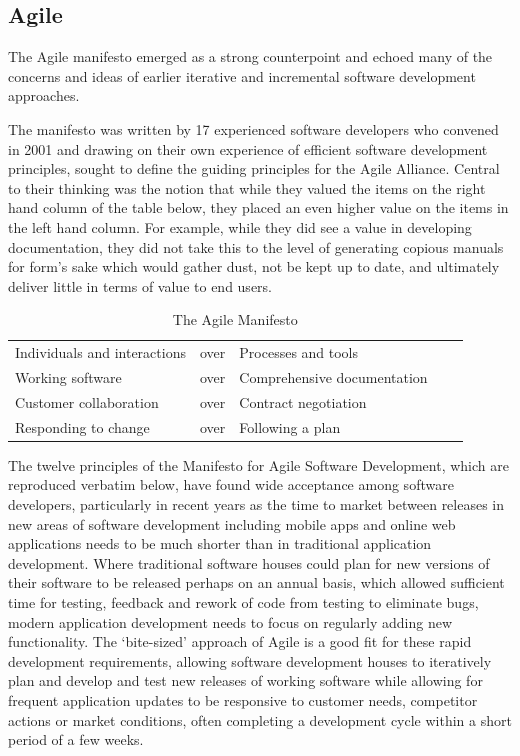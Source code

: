\documentclass[a4paper,12pt]{article}
\begin{document}
\begin{samepage}
\begin{samepage}
\subsection {Agile}
The Agile manifesto emerged as a strong counterpoint and echoed many of the concerns and ideas of earlier iterative and incremental software development approaches.

The manifesto was written by 17 experienced software developers who convened in 2001 and drawing on their own experience of efficient software development principles, sought to define the guiding principles for the Agile Alliance. Central to their thinking was the notion that while they valued the items on the right hand column of the table below, they placed an even higher value on the items in the left hand column. For example, while they did see a value in developing documentation, they did not take this to the level of generating copious manuals for form's sake which would gather dust, not be kept up to date, and ultimately deliver little in terms of value to end users.


\begin{table}[]
\centering
\caption{The Agile Manifesto}
\label{my-label}
\begin{tabular}{|l|l|l|ll}
\cline{1-3}
Individuals and interactions & over & Processes and tools          \\ \cline{1-3}
Working software             & over & Comprehensive documentation \\ \cline{1-3}
Customer collaboration       & over & Contract negotiation        \\ \cline{1-3}
Responding to change         & over & Following a plan              \\ \cline{1-3}
\end{tabular}
\end{table}

The twelve principles of the Manifesto for Agile Software Development, which are reproduced verbatim below, have found wide acceptance among software developers, particularly in recent years as the time to market between releases in new areas of software development including mobile apps and online web applications needs to be much shorter than in traditional application development. Where traditional software houses could plan for new versions of their software to be released perhaps on an annual basis, which allowed sufficient time for testing, feedback and rework of code from testing to eliminate bugs, modern application development needs to focus on regularly adding new functionality. The `bite-sized' approach of Agile is a good fit for these rapid development requirements, allowing software development houses to iteratively plan and develop and test new releases of working software while allowing for frequent application updates to be responsive to customer needs, competitor actions or market conditions, often completing a development cycle within a short period of a few weeks.


\end{samepage}
\end{samepage}
\end{document}
